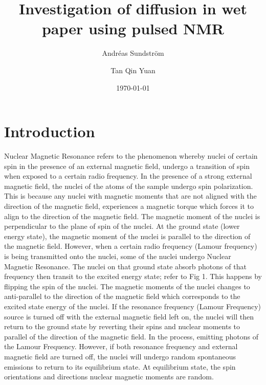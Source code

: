 \documentclass[11pt,a4paper, 
english, swedish %
]{article}
\begin{document}


\title{Investigation of diffusion in wet paper using pulsed NMR}
\author{Andréas Sundström \and Tan Qin Yuan}
\date{\today}

\maketitle


\begin{abstract} 


\end{abstract}




\section{Introduction}

Nuclear Magnetic Resonance refers to the phenomenon whereby nuclei of certain spin in the presence of an external magnetic field, undergo a transition of spin when exposed to a certain radio frequency. In the presence of a strong external magnetic field, the nuclei of the atoms of the sample undergo spin polarization. This is because any nuclei with magnetic moments that are not aligned with the direction of the magnetic field, experiences a magnetic torque which forces it to align to the direction of the magnetic field. The magnetic moment of the nuclei is perpendicular to the plane of spin of the nuclei. At the ground state (lower energy state), the magnetic moment of the nuclei is parallel to the direction of the magnetic field. However, when a certain radio frequency (Lamour frequency) is being transmitted onto the nuclei, some of the nuclei undergo Nuclear Magnetic Resonance. The nuclei on that ground state absorb photons of that frequency then transit to the excited energy state; refer to Fig 1. This happens by flipping the spin of the nuclei. The magnetic moments of the nuclei changes to anti-parallel to the direction of the magnetic field which corresponds to the excited state energy of the nuclei. If the resonance frequency (Lamour Frequency) source is turned off with the external magnetic field left on, the nuclei will then return to the ground state by reverting their spins and nuclear moments to parallel of the direction of the magnetic field. In the process, emitting photons of the Lamour Frequency. However, if both resonance frequency and external magnetic field are turned off, the nuclei will undergo random spontaneous emissions to return to its equilibrium state. At equilibrium state, the spin orientations and directions nuclear magnetic moments are random.   
\end{document}
